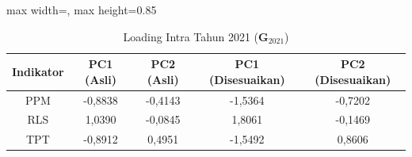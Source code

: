 \begin{table}[H]
\centering
\caption{Loading Intra Tahun 2021 ($\mathbf{G}_{2021}$)} \label{tab:sample2loading_intra_2021}
\begin{adjustbox}{max width=\textwidth, max height=0.85\textheight}
\begin{tabular}{|c|c|c|c|c|}
\hline
\textbf{Indikator} & \textbf{PC1 (Asli)} & \textbf{PC2 (Asli)} & \textbf{PC1 (Disesuaikan)} & \textbf{PC2 (Disesuaikan)} \\
\hline
PPM & -0,8838 & -0,4143 & -1,5364 & -0,7202 \\
RLS & 1,0390 & -0,0845 & 1,8061 & -0,1469 \\
TPT & -0,8912 & 0,4951 & -1,5492 & 0,8606 \\
\hline
\end{tabular}
\end{adjustbox}
\end{table}